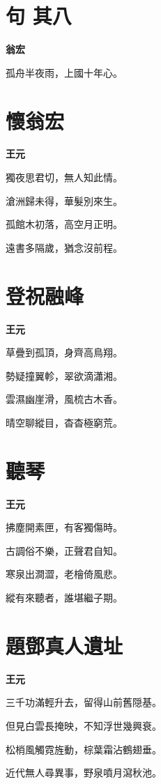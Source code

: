 \documentclass[12pt,a4paper]{ctexbook}
\begin{document}
\section{句  其八}
\textbf{翁宏}\par\vspace{0.5em}
孤舟半夜雨，上國十年心。\par

\section{懷翁宏}
\textbf{王元}\par\vspace{0.5em}
獨夜思君切，無人知此情。\par
滄洲歸未得，華髮別來生。\par
孤館木初落，高空月正明。\par
遠書多隔歲，猶念沒前程。\par

\section{登祝融峰}
\textbf{王元}\par\vspace{0.5em}
草疊到孤頂，身齊高鳥翔。\par
勢疑撞翼軫，翠欲滴瀟湘。\par
雲濕幽崖滑，風梳古木香。\par
晴空聊縱目，杳杳極窮荒。\par

\section{聽琴}
\textbf{王元}\par\vspace{0.5em}
拂塵開素匣，有客獨傷時。\par
古調俗不樂，正聲君自知。\par
寒泉出澗澀，老檜倚風悲。\par
縱有來聽者，誰堪繼子期。\par

\section{題鄧真人遺址}
\textbf{王元}\par\vspace{0.5em}
三千功滿輕升去，留得山前舊隠基。\par
但見白雲長掩映，不知浮世幾興衰。\par
松梢風觸霓旌動，棕葉霜沾鶴翅垂。\par
近代無人尋異事，野泉噴月瀉秋池。\par
\end{document}

